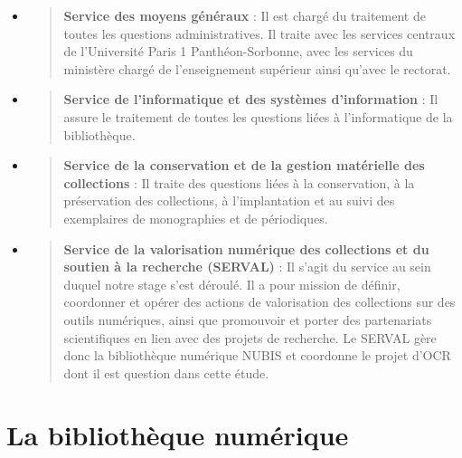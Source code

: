 \documentclass[a4paper,12pt,twoside]{book}
\begin{document}
\begin{itemize}
	\item
	\begin{quote}
		\textbf{Service des moyens généraux
		} : Il est chargé du traitement de toutes les questions administratives. Il traite avec les services centraux de l’Université Paris 1 Panthéon-Sorbonne, avec les services du ministère chargé de l’enseignement supérieur ainsi qu’avec le rectorat.
	\end{quote}
	\item
	\begin{quote}
		\textbf{Service de l'informatique et des systèmes d'information} :
		Il assure le traitement de toutes les questions liées à l’informatique de la bibliothèque.
	\end{quote}
	\item
	\begin{quote}
		\textbf{Service de la conservation et de la gestion matérielle des collections} : Il traite des questions liées à la conservation, à la préservation des collections, à l’implantation et au suivi des exemplaires de monographies et de périodiques.
	\end{quote}
	\item
	\begin{quote}
		\textbf{Service de la valorisation numérique des collections et du soutien à la recherche (SERVAL)
		} : Il s’agit du service au sein duquel notre stage s’est déroulé. Il a pour mission de définir, coordonner et opérer des actions de valorisation des collections sur des outils numériques, ainsi que promouvoir et porter des partenariats scientifiques en lien avec des projets de recherche. Le SERVAL gère donc la bibliothèque numérique NUBIS et coordonne le projet d’OCR dont il est question dans cette étude. 
	\end{quote}
\end{itemize} 


\section{La bibliothèque numérique}
\end{document}
